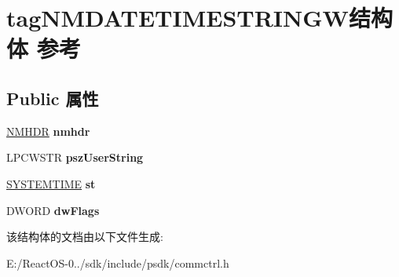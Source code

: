 \hypertarget{structtag_n_m_d_a_t_e_t_i_m_e_s_t_r_i_n_g_w}{}\section{tag\+N\+M\+D\+A\+T\+E\+T\+I\+M\+E\+S\+T\+R\+I\+N\+G\+W结构体 参考}
\label{structtag_n_m_d_a_t_e_t_i_m_e_s_t_r_i_n_g_w}
\subsection*{Public 属性}
\begin{DoxyCompactItemize}
\item 
\mbox{\label{structtag_n_m_d_a_t_e_t_i_m_e_s_t_r_i_n_g_w_a53123db04e176a29dd80c7837404380f}} 
\hyperlink{structtag_n_m_h_d_r}{N\+M\+H\+DR} {\bfseries nmhdr}
\item 
\mbox{\label{structtag_n_m_d_a_t_e_t_i_m_e_s_t_r_i_n_g_w_a0ecb55c2262dfcb0e62fe29acc519325}} 
L\+P\+C\+W\+S\+TR {\bfseries psz\+User\+String}
\item 
\mbox{\label{structtag_n_m_d_a_t_e_t_i_m_e_s_t_r_i_n_g_w_a425ef4cbd9c180c01048e078dd8faf6d}} 
\hyperlink{struct___s_y_s_t_e_m_t_i_m_e}{S\+Y\+S\+T\+E\+M\+T\+I\+ME} {\bfseries st}
\item 
\mbox{\label{structtag_n_m_d_a_t_e_t_i_m_e_s_t_r_i_n_g_w_a17634e1e4a9f5615cfd6c41a4e52939c}} 
D\+W\+O\+RD {\bfseries dw\+Flags}
\end{DoxyCompactItemize}


该结构体的文档由以下文件生成\+:\begin{DoxyCompactItemize}
\item 
E\+:/\+React\+O\+S-\/0../sdk/include/psdk/commctrl.\+h\end{DoxyCompactItemize}
